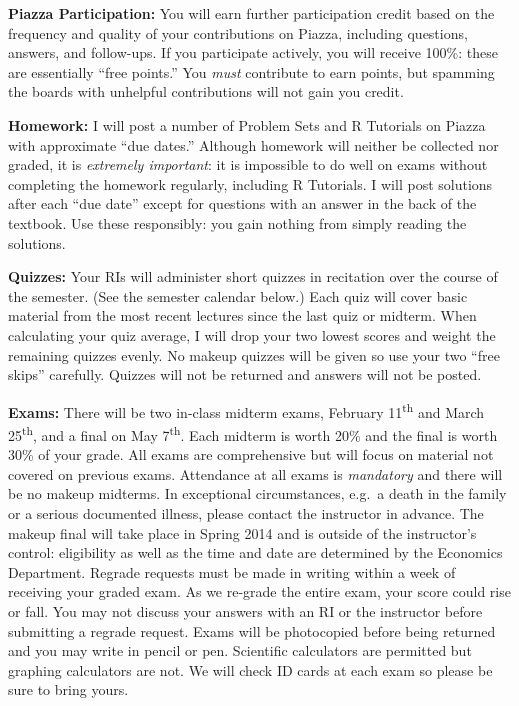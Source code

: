 \documentclass[11pt, letterpaper]{article}
\begin{document}
\medskip

\noindent \textbf{Piazza Participation:} 
You will earn further participation credit based on the frequency and quality of your contributions on Piazza, including questions, answers, and follow-ups. 
If you participate actively, you will receive 100\%: these are essentially ``free points.''  
You \emph{must} contribute to earn points, but spamming the boards with unhelpful contributions will not gain you credit.  


\medskip



\noindent \textbf{Homework:} 
I will post a number of Problem Sets and R Tutorials on Piazza with approximate ``due dates.'' 
Although homework will neither be collected nor graded, it is \emph{extremely important}: it is impossible to do well on exams without completing the homework regularly, including R Tutorials. 
I will post solutions after each ``due date'' except for questions with an answer in the back of the textbook. 
Use these responsibly: you gain nothing from simply reading the solutions.


 \medskip

\noindent \textbf{Quizzes:} 
Your RIs will administer  short quizzes in recitation over the course of the semester. 
(See the semester calendar below.) 
Each quiz will cover basic material from the most recent lectures since the last quiz or midterm. 
When calculating your quiz average, I will drop your two lowest scores and weight the remaining quizzes evenly. 
No makeup quizzes will be given so use your two ``free skips'' carefully.
Quizzes will not be returned and answers will not be posted.

\medskip

\noindent \textbf{Exams:} 
There will be two in-class midterm exams, February 11\textsuperscript{th} and March 25\textsuperscript{th}, and a final on May 7\textsuperscript{th}.
Each midterm is worth 20\% and the final is worth 30\% of your grade. 
All exams are comprehensive but will focus on material not covered on previous exams. 
Attendance at all exams is \emph{mandatory} and there will be no makeup midterms. 
In exceptional circumstances, e.g.\ a death in the family or a serious documented illness, please contact the instructor in advance. 
The makeup final will take place in Spring 2014 and is outside of the instructor's control: eligibility as well as the time and date are determined by the Economics Department. 
Regrade requests must be made in writing within a week of receiving your graded exam. 
As we re-grade the entire exam, your score could rise or fall. 
You may not discuss your answers with an RI or the instructor before submitting a regrade request. 
Exams will be photocopied before being returned and you may write in pencil or pen. 
Scientific calculators are permitted but graphing calculators are not. 
We will check ID cards at each exam so please be sure to bring yours. 
\end{document}

